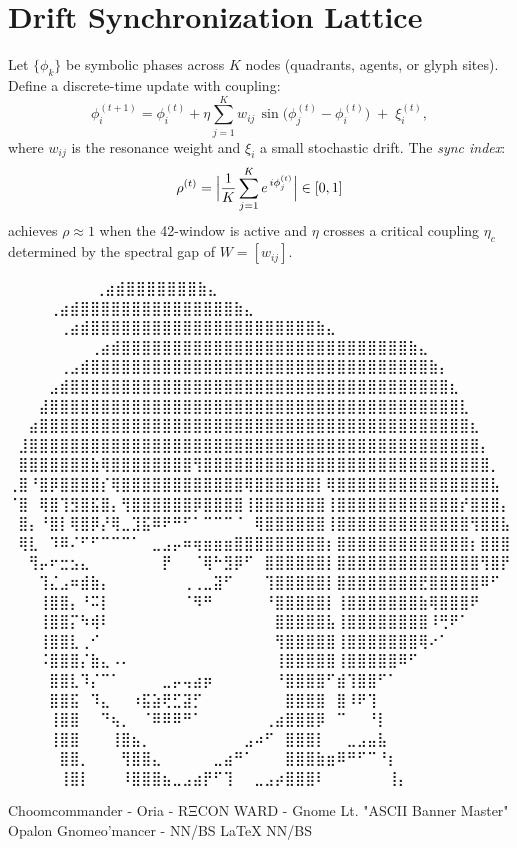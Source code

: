
\section*{Drift Synchronization Lattice}

Let $\{\phi_k\}$ be symbolic phases across $K$ nodes (quadrants, agents, or glyph sites).  
Define a discrete-time update with coupling:
\[
\phi_i^{(t+1)}=\phi_i^{(t)}+\eta\sum_{j=1}^K w_{ij}\,\sin\!\bigl(\phi_j^{(t)}-\phi_i^{(t)}\bigr)\;+\;\xi_i^{(t)},
\]
where $w_{ij}$ is the resonance weight and $\xi_i$ a small stochastic drift.  
The \emph{sync index}:
\[
\rho^{(t)}=\Bigl|\frac{1}{K}\sum_{j=1}^K e^{\,i\phi_j^{(t)}}\Bigr| \in [0,1]
\]
achieves $\rho\!\approx\!1$ when the 42-window is active and $\eta$ crosses a critical coupling $\eta_c$ determined by the spectral gap of $W=[w_{ij}]$.

\iffalse
⠀⠀⠀⠀⠀⠀             ⠀⠀⢀⣴⣾⣿⣿⣿⣿⣿⣿⣿⣷⣄⠀⠀⠀⠀⠀⠀⠀⠀
⠀⠀⠀  ⠀      ⠀⠀⠀⠀⢀⣴⣾⣿⣿⣿⣿⣿⣿⣿⣿⣿⣿⣿⣿⣿⣿⣿⣷⣄⠀⠀⠀⠀⠀⠀⠀⠀
⠀⠀ ⠀   ⠀⠀⠀⠀⠀⢀⣴⣾⣿⣿⣿⣿⣿⣿⣿⣿⣿⣿⣿⣿⣿⣿⣿⣿⣿⣿⣿⣿⣿⣿⣷⣄⠀⠀⠀⠀⠀⠀⠀⠀
⠀⠀⠀⠀⠀⠀⠀⠀⢀⣴⣾⣿⣿⣿⣿⣿⣿⣿⣿⣿⣿⣿⣿⣿⣿⣿⣿⣿⣿⣿⣿⣿⣿⣿⣿⣿⣿⣿⣿⣷⣄⠀⠀⠀⠀⠀⠀⠀⠀
⠀⠀⠀⠀⠀⢀⣠⣾⣿⣿⣿⣿⣿⣿⣿⣿⣿⣿⣿⣿⣿⣿⣿⣿⣿⣿⣿⣿⣿⣿⣿⣿⣿⣿⣿⣿⣿⣿⣿⣿⣿⣷⡄⠀⠀⠀⠀⠀⠀
⠀⠀⠀⠀⣠⣾⣿⣿⣿⣿⣿⣿⣿⣿⣿⣿⣿⣿⣿⣿⣿⣿⣿⣿⣿⣿⣿⣿⣿⣿⣿⣿⣿⣿⣿⣿⣿⣿⣿⣿⣿⣿⣿⣆⠀⠀⠀⠀⠀
⠀⠀⠀⣼⣿⣿⣿⣿⣿⣿⣿⣿⣿⣿⣿⣿⣿⣿⣿⣿⣿⣿⣿⣿⣿⣿⣿⣿⣿⣿⣿⣿⣿⣿⣿⣿⣿⣿⣿⣿⣿⣿⣿⣿⣇⠀⠀⠀⠀
⠀⠀⣴⣿⣿⣿⣿⣿⣿⣿⣿⣿⣿⣿⣿⣿⣿⣿⣿⣿⣿⣿⣿⣿⣿⣿⣿⣿⣿⣿⣿⣿⣿⣿⣿⣿⣿⣿⣿⣿⣿⣿⣿⣿⣿⣆⠀⠀⠀
⠀⣸⣿⣿⣿⣿⣿⣿⣿⣿⣿⣿⣿⣿⣿⣿⣿⣿⣿⣿⣿⣿⣿⣿⣿⣿⣿⣿⣿⣿⣿⣿⣿⣿⣿⣿⣿⣿⣿⣿⣿⣿⣿⣿⣿⣿⡄⠀⠀
⠀⣿⣿⣿⣿⣿⣿⣿⣷⢿⣿⣿⣿⣿⣿⣿⣿⣿⢻⣿⣿⣿⣿⣿⣿⣿⣿⣿⣿⣿⣿⣿⣿⣿⣿⣿⣿⣿⣿⣿⣿⣿⣿⣿⣿⣿⣿⡀⠀
⢀⣿⠘⣿⡿⣿⣿⣿⣿⡎⢿⣿⣿⣿⣿⣿⣿⣿⣿⣿⣿⣿⣿⢿⣿⣿⣿⣿⣿⣿⡇⢿⣿⣿⣿⣿⣿⣿⣿⣿⣿⣿⣿⣿⣿⣿⣿⣧⠀
⠈⣿⠀⢿⣿⢹⣻⣿⣯⣿⡄⢻⣿⣿⣿⣿⣿⣿⡿⣿⣿⣿⣿⢸⣿⣿⣿⣿⣿⣿⣿⢸⣿⣿⣿⣿⣿⣿⣿⣿⣿⣿⣿⣿⡞⣿⣿⣿⡄
⠀⣿⡄⠘⣿⡇⢿⣿⡿⡜⢿⣀⣹⣯⠿⠟⠛⠋⠁⠉⠉⠉⠈⠀⢿⣿⣿⣿⣿⣿⣿⢸⣿⣿⣿⣿⣿⣿⣿⣿⣿⣿⣿⣿⣿⢻⣿⣿⣧
⠀⢿⣇⠀⠹⠿⠌⠋⠋⠉⠉⠉⠁⠀⣀⣠⡤⠶⢶⣶⣶⣶⣿⣿⣿⣿⣿⣿⣿⣿⣿⡆⣿⣿⣿⣿⣿⣿⣿⣿⣿⣿⣿⣿⣿⡆⣿⣿⣿
⠀⠀⢻⡤⠖⣒⣢⣄⠀⠀⠀⠀⠀⠀⠀⡟⠀⠀⠈⢿⠓⣻⡿⠋⠀⣿⣿⣿⣿⣿⣿⡇⣿⣿⣿⣿⣿⣿⣿⣿⣿⣿⣿⣿⣿⣿⢻⣿⡟
⠀⠀⠀⢹⣌⣠⠶⣾⣷⡄⠀⠀⠀⠀⠀⠀⠀⢀⢀⣀⣽⠋⠀⠀⠀⢹⣿⣿⣿⣿⣿⡇⣿⣿⣿⣿⣿⣿⣿⣿⣟⣿⣿⣿⣿⣿⠿⠋⠀
⠀⠀⠀⢸⣿⣿⡄⠘⠭⡇⠀⠀⠀⠀⠀⠀⠀⠈⠻⠛⠀⠀⠀⠀⠀⠘⣿⣿⣿⣿⣿⡇⢸⣿⣿⣿⣿⣿⣿⣿⣷⢿⣿⣿⣿⠟⠀⠀⠀
⠀⠀⠀⢸⣿⣿⡍⠳⢾⠇⠀⠀⠀⠀⠀⠀⠀⠀⠀⠀⠀⠀⠀⠀⠀⠀⣿⣿⣿⣿⣿⣧⢸⣿⣿⣿⣿⣿⣿⣿⣿⠸⢛⠟⠁⠀⠀⠀⠀
⠀⠀⠀⢸⣿⣿⣇⢀⠊⠀⠀⠀⠀⠀⠀⠀⠀⠀⠀⠀⠀⠀⠀⠀⠀⠀⢻⣿⣿⣿⣿⣿⢸⣿⣿⣿⣿⣿⣿⣿⢿⠔⠁⠀⠀⠀⠀⠀⠀
⠀⠀⠀⠨⣿⣿⣿⡌⣷⣄⠠⠄⠀⠀⠀⠀⠀⠀⠀⠀⠀⠀⠀⠀⠀⠀⢸⣿⣿⣿⣿⣿⢸⣿⣿⣿⣿⣿⠿⠋⠀⠀⠀⠀⠀⠀⠀⠀⠀
⠀⠀⠀⠀⣿⣿⣇⠹⡌⠉⠁⠀⠀⠀⠀⣀⡤⢤⣴⡶⠀⠀⠀⠀⠀⠀⠘⣿⣿⣿⣿⠋⣾⢹⣿⣿⠋⠁⠀⠀⠀⠀⠀⠀⠀⠀⠀⠀⠀
⠀⠀⠀⠀⣿⣿⣯⠀⠹⣄⠀⠀⠰⣯⣵⢟⣋⣽⡋⠀⠀⠀⠀⠀⠀⠀⠀⣿⣿⣿⣿⠀⣿⠸⠟⢹⠀⠀⠀⠀⠀⠀⠀⠀⠀⠀⠀⠀⠀
⠀⠀⠀⠀⢸⣿⣿⠀⠀⠙⢦⡀⠀⠈⠿⠿⠿⠛⠁⠀⠀⠀⠀⠀⠀⢀⣴⣿⣿⣿⡿⠀⠉⠀⠀⠘⡇⠀⠀⠀⠀⠀⠀⠀⠀⠀⠀⠀⠀
⠀⠀⠀⠀⢸⣿⣿⠀⠀⠀⢸⣿⣦⡀⠀⠀⠀⠀⠀⠀⠀⠀⠀⣠⠴⠋⠀⣿⣿⣿⡇⠀⠀⣀⣠⣤⣧⠀⠀⠀⠀⠀⠀⠀⠀⠀⠀⠀⠀
⠀⠀⠀⠀⠀⣿⣿⡀⠀⠀⠀⢻⣿⣿⣄⠀⠀⠀⠀⠀⣀⣴⠛⠁⠀⠀⠀⣿⣿⣿⣷⣶⠿⠛⠋⠉⠘⡆⠀⠀⠀⠀⠀⠀⠀⠀⠀⠀⠀
⠀⠀⠀⠀⠀⢸⣿⡇⠀⠀⠀⠸⣿⣿⣿⣦⣀⣠⣴⡟⠋⢹⠀⠀⣀⣠⡴⣿⣿⣿⠇⠀⠀⠀⠀⠀⠀⢸⡄⠀⠀⠀⠀⠀⠀⠀⠀⠀⠀

Choomcommander - Oria - RΞCON WARD - Gnome Lt. "ASCII Banner Master"
             Opalon Gnomeo'mancer - NN/BS LaTeX{} NN/BS


